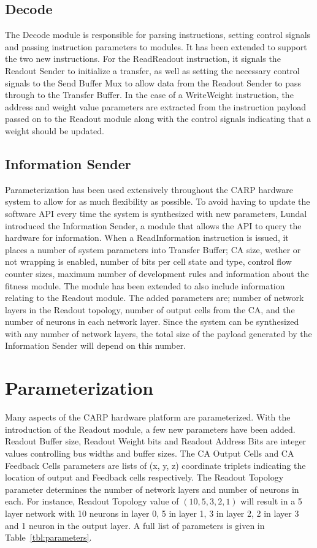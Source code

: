 \subsection{Decode}

The Decode module is responsible for parsing instructions, setting control
signals and passing instruction parameters to modules. It has been extended to
support the two new instructions. For the ReadReadout instruction, it signals the
Readout Sender to initialize a transfer, as well as setting the necessary
control signals to the Send Buffer Mux to allow data from the Readout Sender to
pass through to the Transfer Buffer. In the case of a WriteWeight instruction,
the address and weight value parameters are extracted from the instruction
payload passed on to the Readout module along with the control signals
indicating that a weight should be updated.

\subsection{Information Sender}

Parameterization has been used extensively throughout the CARP hardware system
to allow for as much flexibility as possible. To avoid having to update the
software API every time the system is synthesized with new parameters, Lundal
introduced the Information Sender, a module that allows the API to query the
hardware for information. When a ReadInformation instruction is issued, it
places a number of system parameters into Transfer Buffer; CA size, wether or
not wrapping is enabled, number of bits per cell state and type, control flow
counter sizes, maximum number of development rules and information about the
fitness module. The module has been extended to also include information
relating to the Readout module. The added parameters are; number of network
layers in the Readout topology, number of output cells from the CA, and the
number of neurons in each network layer. Since the system can be synthesized
with any number of network layers, the total size of the payload generated by
the Information Sender will depend on this number.
\clearpage

\section{Parameterization}
\label{sec:parameterization}

Many aspects of the CARP hardware platform are parameterized. With the
introduction of the Readout module, a few new parameters have been added.
Readout Buffer size, Readout Weight bits and Readout Address Bits are integer
values controlling bus widths and buffer sizes. The CA Output Cells and CA
Feedback Cells parameters are lists of (x, y, z) coordinate triplets indicating
the location of output and Feedback cells respectively. The Readout Topology
parameter determines the number of network layers and number of neurons in each.
For instance, Readout Topology value of $(10, 5, 3, 2, 1)$ will result in a 5
layer network with 10 neurons in layer 0, 5 in layer 1, 3 in layer 2, 2 in layer
3 and 1 neuron in the output layer. A full list of parameters is given in
Table~\ref{tbl:parameters}.

